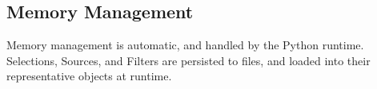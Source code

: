 \subsection{Memory Management}
Memory management is automatic, and handled by the Python runtime. Selections, Sources, and Filters are persisted to files, and loaded into their representative objects at runtime.